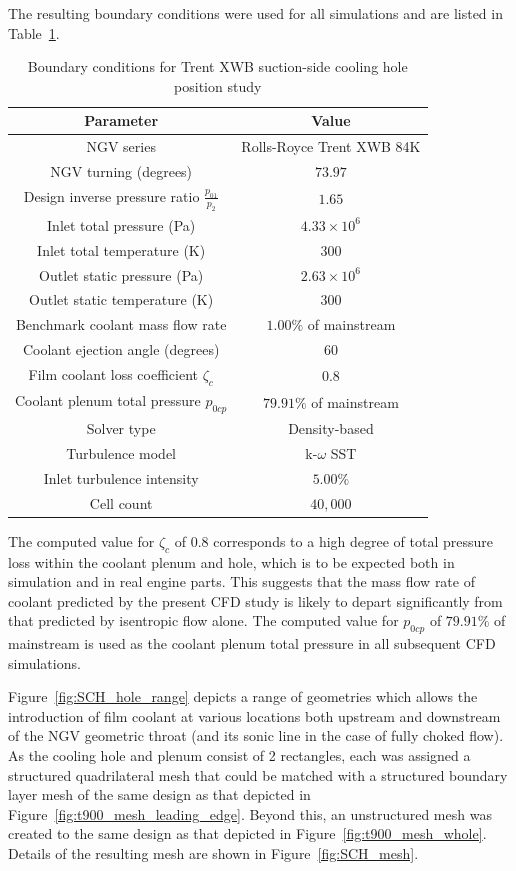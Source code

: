 \documentclass[a4paper, 11pt, oneside]{report}
\begin{document}
The resulting boundary conditions were used for all simulations and are listed in Table~\ref{SCH_parameters}.

\begin{table}[H]
\caption{Boundary conditions for Trent XWB suction-side cooling hole position study}
\label{SCH_parameters}
\begin{center}
\begin{tabular}{|c|c|}
\hline
Parameter & Value\\
\hline
NGV series & Rolls-Royce Trent XWB 84K\\
NGV turning (degrees) & $73.97$\\
Design inverse pressure ratio $\frac{p_{01}}{p_2}$ & $1.65$\\
Inlet total pressure (Pa) & $4.33 \times 10^6$\\
Inlet total temperature (K) & $300$\\
Outlet static pressure (Pa) & $2.63 \times 10^6$\\
Outlet static temperature (K) & $300$\\
Benchmark coolant mass flow rate & $1.00\%$ of mainstream\\
Coolant ejection angle (degrees) & $60$\\
Film coolant loss coefficient $\zeta_c$ & $0.8$\\
Coolant plenum total pressure $p_{0cp}$ & $79.91\%$ of mainstream\\
Solver type & Density-based\\
Turbulence model & k-$\omega$ SST\\
Inlet turbulence intensity & $5.00\%$\\
Cell count & $40,000$\\
\hline
\end{tabular}
\end{center}
\end{table}

The computed value for $\zeta_c$ of $0.8$ corresponds to a high degree of total pressure loss within the coolant plenum and hole, which is to be expected both in simulation and in real engine parts. This suggests that the mass flow rate of coolant predicted by the present CFD study is likely to depart significantly from that predicted by isentropic flow alone. The computed value for $p_{0cp}$ of $79.91\%$ of mainstream is used as the coolant plenum total pressure in all subsequent CFD simulations.

Figure~\ref{fig:SCH_hole_range} depicts a range of geometries which allows the introduction of film coolant at various locations both upstream and downstream of the NGV geometric throat (and its sonic line in the case of fully choked flow). As the cooling hole and plenum consist of 2 rectangles, each was assigned a structured quadrilateral mesh that could be matched with a structured boundary layer mesh of the same design as that depicted in Figure~\ref{fig:t900_mesh_leading_edge}. Beyond this, an unstructured mesh was created to the same design as that depicted in Figure~\ref{fig:t900_mesh_whole}. Details of the resulting mesh are shown in Figure~\ref{fig:SCH_mesh}.
\end{document}
